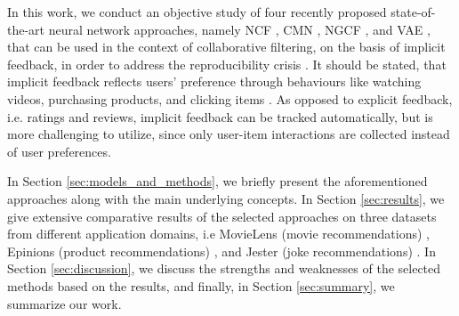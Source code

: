 In this work, we conduct an objective study of four recently proposed state-of-the-art neural network approaches, namely NCF \cite{he2017neural}, CMN \cite{ebesu2018collaborative}, NGCF \cite{wang2019neural}, and VAE \cite{liang2018variational}, that can be used in the context of collaborative filtering, on the basis of implicit feedback, in order to address the reproducibility crisis \cite{dacrema2019we}.
It should be stated, that implicit feedback reflects users' preference through behaviours like watching videos, purchasing products, and clicking items \cite{hu2008collaborative}.
As opposed to explicit feedback, i.e. ratings and reviews, implicit feedback can be tracked automatically, but is more challenging to utilize, since only user-item interactions are collected instead of user preferences.

In Section \ref{sec:models_and_methods}, we briefly present the aforementioned approaches along with the main underlying concepts.
In Section \ref{sec:results}, we give extensive comparative results of the selected approaches on three datasets from different application domains, i.e MovieLens (movie recommendations) \cite{harper2016movielens}, Epinions (product recommendations) \cite{epinions}, and Jester (joke recommendations) \cite{jester}.
In Section \ref{sec:discussion}, we discuss the strengths and weaknesses of the selected methods based on the results, and finally, in Section \ref{sec:summary}, we summarize our work.

